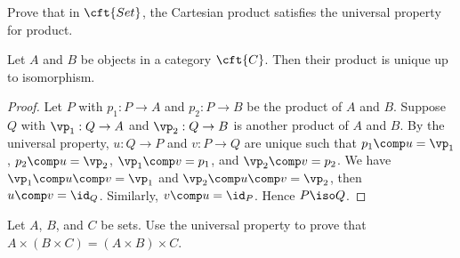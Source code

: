 \documentclass[10pt]{article}
\begin{document}
\begin{center}
\end{center}
\begin{problem}
    Prove that in $\cft{Set}$, the Cartesian product satisfies the universal property for product.
\end{problem}
\begin{proposition}
    Let $A$ and $B$ be objects in a category $\cft{C}$. Then their product is unique up to isomorphism.
\end{proposition}
\begin{proof}
    Let $P$ with ${p}_{1}:P\to A$ and ${p}_{2}:P\to B$ be the product of $A$ and $B$. Suppose $Q$ with ${\vp}_{1}:Q\to A$ and ${\vp}_{2}:Q\to B$ is another product of $A$ and $B$. By the universal property, $u:Q\to P$ and $v:P\to Q$ are unique such that ${p}_{1}\comp u={\vp}_{1}$, ${p}_{2}\comp u={\vp}_{2}$, ${\vp}_{1}\comp v={p}_{1}$, and ${\vp}_{2}\comp v={p}_{2}$. We have ${\vp}_{1}\comp u\comp v={\vp}_{1}$ and ${\vp}_{2}\comp u\comp v={\vp}_{2}$, then $u\comp v={\id}_{Q}$. Similarly, $v\comp u={\id}_{P}$. Hence $P\iso Q$.
\end{proof}
\begin{center}
\end{center}
\begin{problem}
    Let $A$, $B$, and $C$ be sets. Use the universal property to prove that $A\times(B\times C)=(A\times B)\times C$.
\end{problem}
\end{document}
